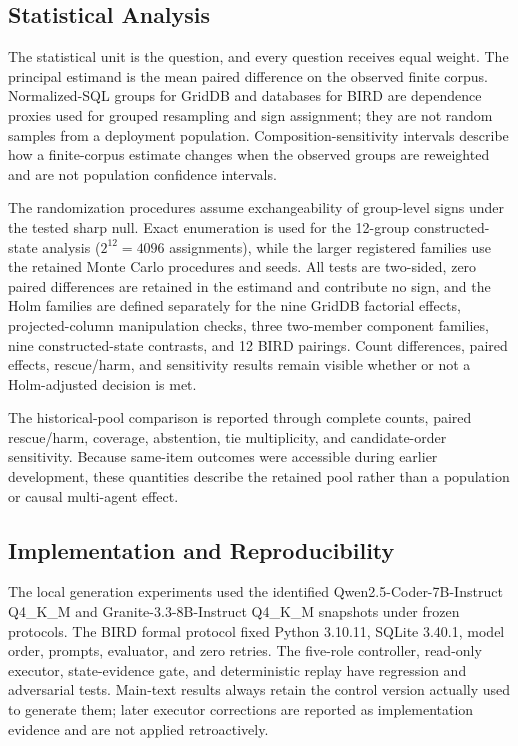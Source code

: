 \documentclass[applsci,article,submit,moreauthors]{Definitions/mdpi}
\begin{document}
\subsection{Statistical Analysis}

The statistical unit is the question, and every question receives equal weight. The principal estimand is the mean paired difference on the observed finite corpus. Normalized-SQL groups for GridDB and databases for BIRD are dependence proxies used for grouped resampling and sign assignment; they are not random samples from a deployment population. Composition-sensitivity intervals describe how a finite-corpus estimate changes when the observed groups are reweighted and are not population confidence intervals.

The randomization procedures assume exchangeability of group-level signs under the tested sharp null. Exact enumeration is used for the 12-group constructed-state analysis ($2^{12}=4096$ assignments), while the larger registered families use the retained Monte Carlo procedures and seeds. All tests are two-sided, zero paired differences are retained in the estimand and contribute no sign, and the Holm families are defined separately for the nine GridDB factorial effects, projected-column manipulation checks, three two-member component families, nine constructed-state contrasts, and 12 BIRD pairings. Count differences, paired effects, rescue/harm, and sensitivity results remain visible whether or not a Holm-adjusted decision is met.

The historical-pool comparison is reported through complete counts, paired rescue/harm, coverage, abstention, tie multiplicity, and candidate-order sensitivity. Because same-item outcomes were accessible during earlier development, these quantities describe the retained pool rather than a population or causal multi-agent effect.

\subsection{Implementation and Reproducibility}

The local generation experiments used the identified Qwen2.5-Coder-7B-Instruct Q4\_K\_M and Granite-3.3-8B-Instruct Q4\_K\_M snapshots under frozen protocols. The BIRD formal protocol fixed Python 3.10.11, SQLite 3.40.1, model order, prompts, evaluator, and zero retries. The five-role controller, read-only executor, state-evidence gate, and deterministic replay have regression and adversarial tests. Main-text results always retain the control version actually used to generate them; later executor corrections are reported as implementation evidence and are not applied retroactively.
\end{document}
